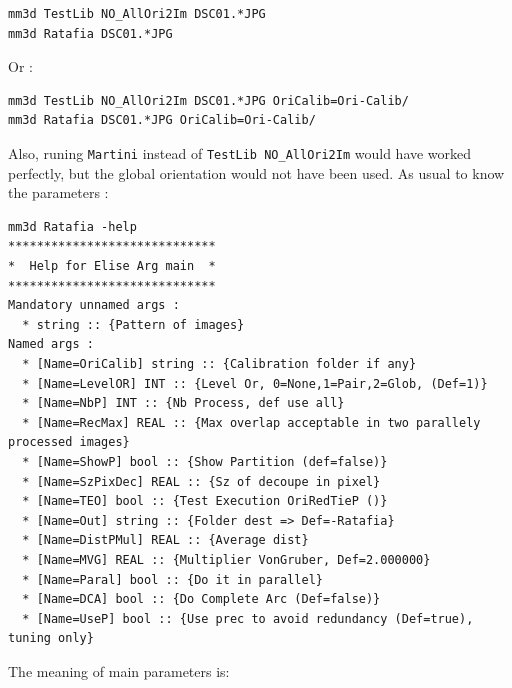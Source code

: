 \begin{verbatim}
mm3d TestLib NO_AllOri2Im DSC01.*JPG
mm3d Ratafia DSC01.*JPG
\end{verbatim}

Or :

\begin{verbatim}
mm3d TestLib NO_AllOri2Im DSC01.*JPG OriCalib=Ori-Calib/
mm3d Ratafia DSC01.*JPG OriCalib=Ori-Calib/
\end{verbatim}


Also, runing {\tt Martini} instead of  {\tt TestLib NO\_AllOri2Im} would have worked perfectly, 
but the global orientation would not have been used. As usual to know the parameters :

\begin{verbatim}
mm3d Ratafia -help
*****************************
*  Help for Elise Arg main  *
*****************************
Mandatory unnamed args : 
  * string :: {Pattern of images}
Named args : 
  * [Name=OriCalib] string :: {Calibration folder if any}
  * [Name=LevelOR] INT :: {Level Or, 0=None,1=Pair,2=Glob, (Def=1)}
  * [Name=NbP] INT :: {Nb Process, def use all}
  * [Name=RecMax] REAL :: {Max overlap acceptable in two parallely processed images}
  * [Name=ShowP] bool :: {Show Partition (def=false)}
  * [Name=SzPixDec] REAL :: {Sz of decoupe in pixel}
  * [Name=TEO] bool :: {Test Execution OriRedTieP ()}
  * [Name=Out] string :: {Folder dest => Def=-Ratafia}
  * [Name=DistPMul] REAL :: {Average dist}
  * [Name=MVG] REAL :: {Multiplier VonGruber, Def=2.000000}
  * [Name=Paral] bool :: {Do it in parallel}
  * [Name=DCA] bool :: {Do Complete Arc (Def=false)}
  * [Name=UseP] bool :: {Use prec to avoid redundancy (Def=true), tuning only}
\end{verbatim}

The meaning of main parameters is:

